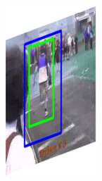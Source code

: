 \documentclass{report}
\begin{document}
\begin{figure}[h]
\begin{subfigure}{0.15\textwidth}
    \includegraphics[width=\textwidth]{output/img_7.jpg}
  \end{subfigure}
  \begin{subfigure}{0.15\textwidth}

\end{subfigure}
\end{figure}
\end{document}
